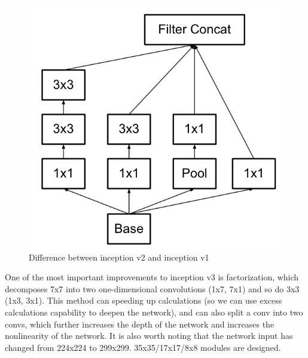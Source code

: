 \documentclass[10pt,twocolumn,letterpaper]{article}
\begin{document}
\begin{figure}[t]
	\begin{center}
		\includegraphics[width=0.8\linewidth]{Pic/16.jpg}
	\end{center}
	\caption{Difference between inception v2 and inception v1} \label{fig:long}
	\label{fig:onecol}
\end{figure}

One of the most important improvements to inception v3 is factorization, which decomposes 7x7 into two one-dimensional convolutions (1x7, 7x1) and so do 3x3 (1x3, 3x1). This method can speeding up calculations (so we can use excess calculations capability to deepen the network), and can also split a conv into two convs, which further increases the depth of the network and increases the nonlinearity of the network. It is also worth noting that the network input has changed from 224x224 to 299x299. 35x35/17x17/8x8 modules are designed.\cite{szegedy2016rethinking}
\end{document}

